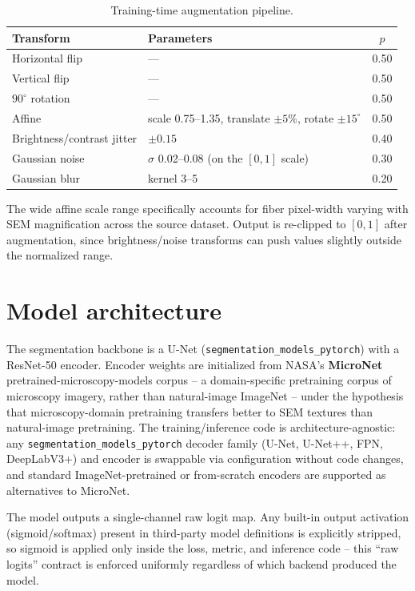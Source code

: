 \documentclass[11pt]{article}
\begin{document}
\begin{table}[h]
\centering
\begin{tabular}{@{}llc@{}}
\toprule
Transform & Parameters & $p$ \\
\midrule
Horizontal flip & --- & 0.50 \\
Vertical flip & --- & 0.50 \\
$90^\circ$ rotation & --- & 0.50 \\
Affine & scale 0.75--1.35, translate $\pm5\%$, rotate $\pm15^\circ$ & 0.50 \\
Brightness/contrast jitter & $\pm0.15$ & 0.40 \\
Gaussian noise & $\sigma$ 0.02--0.08 (on the $[0,1]$ scale) & 0.30 \\
Gaussian blur & kernel 3--5 & 0.20 \\
\bottomrule
\end{tabular}
\caption{Training-time augmentation pipeline.}
\end{table}

The wide affine scale range specifically accounts for fiber pixel-width
varying with SEM magnification across the source dataset. Output is
re-clipped to $[0, 1]$ after augmentation, since brightness/noise transforms
can push values slightly outside the normalized range.

\section{Model architecture}

The segmentation backbone is a U-Net (\texttt{segmentation\_models\_pytorch})
with a ResNet-50 encoder. Encoder weights are initialized from NASA's
\textbf{MicroNet} pretrained-microscopy-models corpus -- a domain-specific
pretraining corpus of microscopy imagery, rather than natural-image ImageNet
-- under the hypothesis that microscopy-domain pretraining transfers better
to SEM textures than natural-image pretraining. The training/inference code
is architecture-agnostic: any \texttt{segmentation\_models\_pytorch} decoder
family (U-Net, U-Net++, FPN, DeepLabV3+) and encoder is swappable via
configuration without code changes, and standard ImageNet-pretrained or
from-scratch encoders are supported as alternatives to MicroNet.

The model outputs a single-channel raw logit map. Any built-in output
activation (sigmoid/softmax) present in third-party model definitions is
explicitly stripped, so sigmoid is applied only inside the loss, metric, and
inference code -- this ``raw logits'' contract is enforced uniformly
regardless of which backend produced the model.
\end{document}
